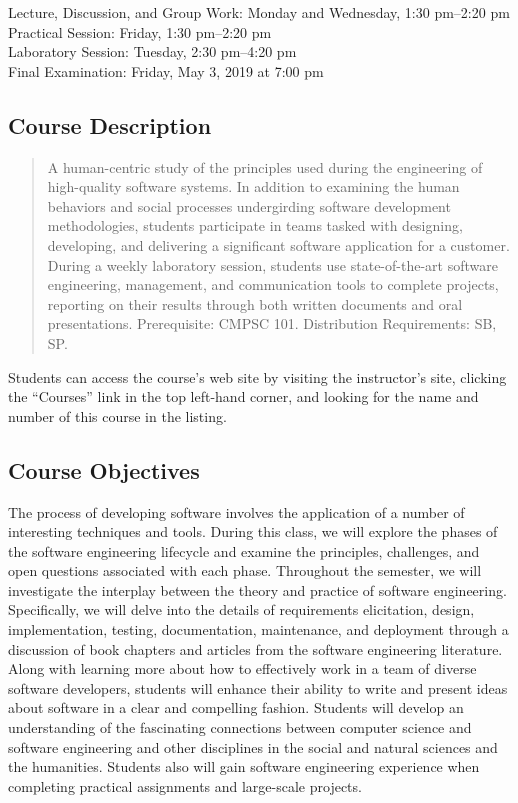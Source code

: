 \documentclass[11pt]{article}
\begin{document}
Lecture, Discussion, and Group Work: Monday and Wednesday, 1:30 pm--2:20 pm \\
Practical Session: Friday, 1:30 pm--2:20 pm \\
Laboratory Session: Tuesday, 2:30 pm--4:20 pm \\
Final Examination: Friday, May 3, 2019 at 7:00 pm

\subsection*{Course Description}

\begin{quote}

A human-centric study of the principles used during the engineering of
high-quality software systems. In addition to examining the human behaviors and
social processes undergirding software development methodologies, students
participate in teams tasked with designing, developing, and delivering a
significant software application for a customer. During a weekly laboratory
session, students use state-of-the-art software engineering, management, and
communication tools to complete projects, reporting on their results through
both written documents and oral presentations. Prerequisite: CMPSC
101. Distribution Requirements: SB, SP.\@ \\

\end{quote}

\noindent Students can access the course's web site by visiting the instructor's
site, clicking the ``Courses'' link in the top left-hand corner, and looking for
the name and number of this course in the listing.

\subsection*{Course Objectives}

The process of developing software involves the application of a number of
interesting techniques and tools. During this class, we will explore the phases
of the software engineering lifecycle and examine the principles, challenges,
and open questions associated with each phase. Throughout the semester, we will
investigate the interplay between the theory and practice of software
engineering. Specifically, we will delve into the details of requirements
elicitation, design, implementation, testing, documentation, maintenance, and
deployment through a discussion of book chapters and articles from the software
engineering literature. Along with learning more about how to effectively work
in a team of diverse software developers, students will enhance their ability
to write and present ideas about software in a clear and compelling fashion.
Students will develop an understanding of the fascinating connections between
computer science and software engineering and other disciplines in the social
and natural sciences and the humanities. Students also will gain software
engineering experience when completing practical assignments and large-scale
projects.
\end{document}
